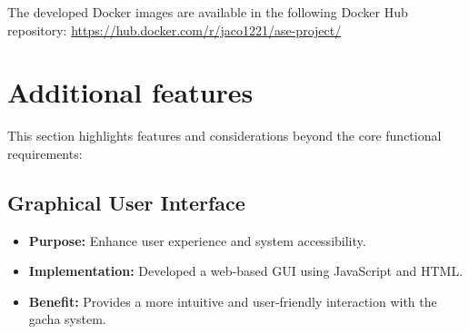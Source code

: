 \documentclass{article}
\begin{document}
The developed Docker images are available in the following Docker Hub repository:
\href{https://hub.docker.com/r/jaco1221/ase-project/}{
https://hub.docker.com/r/jaco1221/ase-project/}
\newpage

\section{Additional features}
This section highlights features and considerations beyond the core functional requirements:

\subsection{Graphical User Interface}
\begin{itemize}
    \item \textbf{Purpose:} Enhance user experience and system accessibility.
    \item \textbf{Implementation:} Developed a web-based GUI using JavaScript and HTML.
    \item \textbf{Benefit:} Provides a more intuitive and user-friendly interaction with the gacha system.
\end{itemize}
\end{document}
